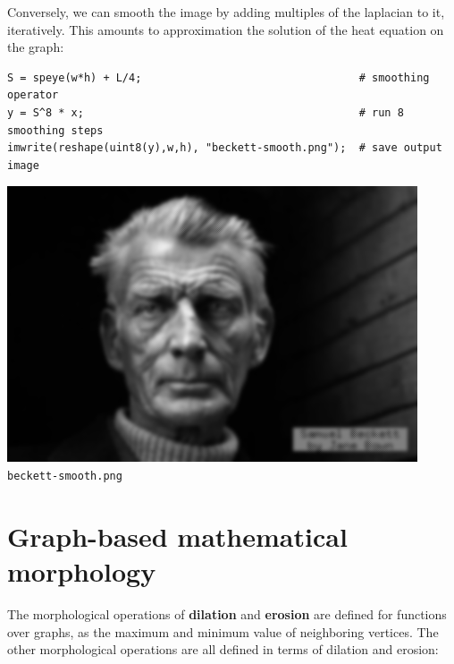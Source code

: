 Conversely, we can smooth the image by adding multiples of the laplacian to
it, iteratively.  This amounts to approximation the solution of the heat
equation on the graph:

\begin{verbatim}
S = speye(w*h) + L/4;                                  # smoothing operator
y = S^8 * x;                                           # run 8 smoothing steps
imwrite(reshape(uint8(y),w,h), "beckett-smooth.png");  # save output image
\end{verbatim}

\includegraphics{beckett-smooth.png}
\verb+beckett-smooth.png+

\section{Graph-based mathematical morphology}

The morphological operations of {\bf dilation} and {\bf erosion} are
defined for functions over graphs, as the maximum and minimum value of
neighboring vertices.  The other morphological operations are all defined in
terms of dilation and erosion:


